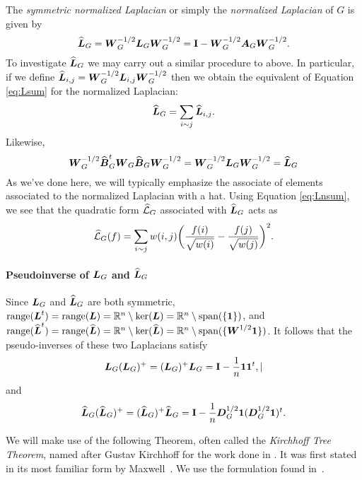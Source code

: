 The \emph{symmetric normalized Laplacian} or simply the \emph{normalized Laplacian} of $G$ is given by 
\begin{equation}
\label{eq:Ln_G}
    \widehat{\vb*{L}}_G = \vb*{W}_G^{-1/2} \vb*{L}_G\vb*{W}_G^{-1/2} = \vb{I} - \vb*{W}_G^{-1/2} \vb*{A}_G\vb*{W}_{G}^{-1/2}.
\end{equation} 
To investigate $\widehat{\vb*{L}}_G$ we may carry out a similar procedure to above. In particular, if we define $\widehat{\vb*{L}}_{i,j}=\vb*{W}_G^{-1/2} \vb*{L}_{i,j}\vb*{W}_G^{-1/2}$ then we obtain the equivalent of Equation \ref{eq:Lsum} for the normalized Laplacian:
\begin{equation}
\label{eq:Lnsum}
    \widehat{\vb*{L}}_G = \sum_{i\sim j}\widehat{\vb*{L}}_{i,j}.
\end{equation}
Likewise, 
\begin{equation*}
   \vb*{W}_G^{-1/2}\widehat{\vb*{B}}_G^t \vb*{W}_G\widehat{\vb*{B}}_G\vb*{W}_G^{-1/2} =  \vb*{W}_G^{-1/2}\vb*{L}_G\vb*{W}_G^{-1/2}=\widehat{\vb*{L}}_G
\end{equation*}
As we've done here, we will typically emphasize the associate of elements associated to the normalized Laplacian with a hat.
Using Equation \eqref{eq:Lnsum}, we see that 
the quadratic form $\widehat{\mathcal{L}}_G$ associated with $\widehat{\vb*{L}}_G$ acts as 
\begin{equation}
\label{eq:Lnf}
    \widehat{\mathcal{L}}_G(f) = \sum_{i\sim j} w(i,j)\bigg(\frac{f(i)}{\sqrt{w(i)}}-\frac{f(j)}{\sqrt{w(j)}}\bigg)^2.
\end{equation}

\paragraph{Pseudoinverse of \texorpdfstring{$\vb*{L}_G$}{the combinatorial} and \texorpdfstring{$\widehat{\vb*{L}}_G$}{normalized Laplacian.}}
Since $\vb*{L}_G$ and $\widehat{\vb*{L}}_G$ are both symmetric, $\textnormal{range}(\vb*{L}^t)=\textnormal{range}(\vb*{L})=\mathbb{R}^n \setminus \ker(\vb*{L})=\mathbb{R}^n \setminus \textnormal{span}(\{\vb{1}\})$, and $\textnormal{range}(\widehat{\vb*{L}}^t)=\textnormal{range}(\widehat{\vb*{L}})=\mathbb{R}^n \setminus \ker(\widehat{\vb*{L}})=\mathbb{R}^n \setminus \textnormal{span}(\{\vb*{W}^{1/2}\vb{1}\})$. It follows that the pseudo-inverses of these two Laplacians satisfy
\begin{equation}
\vb*{L}_G(\vb*{L}_G)^+ = (\vb*{L}_G)^+\vb*{L}_G = \vb{I} - \frac{1}{n}\vb{1}\vb{1}^t,\label{eq:LL+}|
\end{equation}
and 
\begin{equation*}
\widehat{\vb*{L}}_G(\widehat{\vb*{L}}_G)^+ = (\widehat{\vb*{L}}_G)^+\widehat{\vb*{L}}_G = \vb{I} - \frac{1}{n}\vb*{D}_G^{1/2}\vb{1}(\vb*{D}_G^{1/2}\vb{1})^t.
\end{equation*}



We will make use  of the following Theorem, often  called the \emph{Kirchhoff Tree Theorem}, named after Gustav Kirchhoff for the work done in \cite{Kirchhoff1847}. It was first stated in its most familiar form by Maxwell~\cite{maxwell1873treatise}. We use the formulation found in~\cite{chaiken1978matrix}. 

